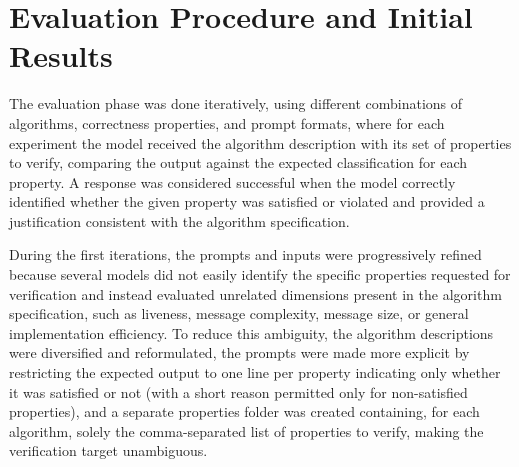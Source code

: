 \label{chap:evaluation}

\section{Evaluation Procedure and Initial Results}

The evaluation phase was done iteratively, using different combinations of algorithms, correctness properties, and prompt formats, where for each experiment the model received the algorithm description with its set of properties to verify, comparing the output against the expected classification for each property. A response was considered successful when the model correctly identified whether the given property was satisfied or violated and provided a justification consistent with the algorithm specification.

During the first iterations, the prompts and inputs were progressively refined because several models did not easily identify the specific properties requested for verification and instead evaluated unrelated dimensions present in the algorithm specification, such as liveness, message complexity, message size, or general implementation efficiency. To reduce this ambiguity, the algorithm descriptions were diversified and reformulated, the prompts were made more explicit by restricting the expected output to one line per property indicating only whether it was satisfied or not (with a short reason permitted only for non-satisfied properties), and a separate properties folder was created containing, for each algorithm, solely the comma-separated list of properties to verify, making the verification target unambiguous.

